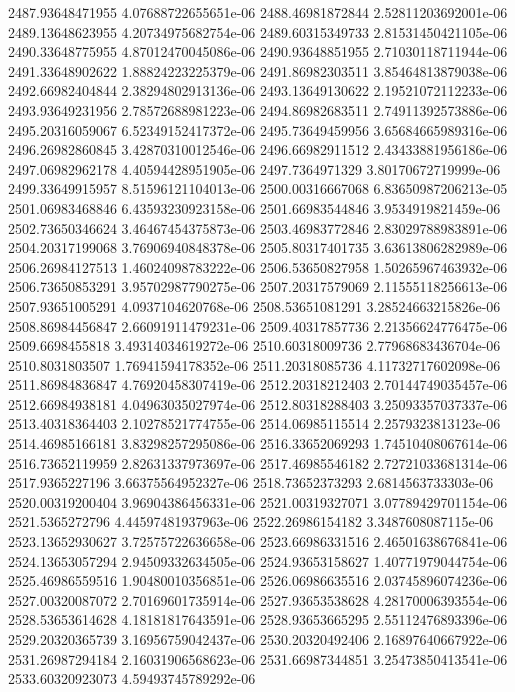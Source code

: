 {2487.93648471955 4.07688722655651e-06
2488.46981872844 2.52811203692001e-06
2489.13648623955 4.20734975682754e-06
2489.60315349733 2.81531450421105e-06
2490.33648775955 4.87012470045086e-06
2490.93648851955 2.71030118711944e-06
2491.33648902622 1.88824223225379e-06
2491.86982303511 3.85464813879038e-06
2492.66982404844 2.38294802913136e-06
2493.13649130622 2.19521072112233e-06
2493.93649231956 2.78572688981223e-06
2494.86982683511 2.74911392573886e-06
2495.20316059067 6.52349152417372e-06
2495.73649459956 3.65684665989316e-06
2496.26982860845 3.42870310012546e-06
2496.66982911512 2.43433881956186e-06
2497.06982962178 4.40594428951905e-06
2497.7364971329 3.80170672719999e-06
2499.33649915957 8.51596121104013e-06
2500.00316667068 6.83650987206213e-05
2501.06983468846 6.43593230923158e-06
2501.66983544846 3.9534919821459e-06
2502.73650346624 3.46467454375873e-06
2503.46983772846 2.83029788983891e-06
2504.20317199068 3.76906940848378e-06
2505.80317401735 3.63613806282989e-06
2506.26984127513 1.46024098783222e-06
2506.53650827958 1.50265967463932e-06
2506.73650853291 3.95702987790275e-06
2507.20317579069 2.11555118256613e-06
2507.93651005291 4.0937104620768e-06
2508.53651081291 3.28524663215826e-06
2508.86984456847 2.66091911479231e-06
2509.40317857736 2.21356624776475e-06
2509.6698455818 3.49314034619272e-06
2510.60318009736 2.77968683436704e-06
2510.8031803507 1.76941594178352e-06
2511.20318085736 4.11732717602098e-06
2511.86984836847 4.76920458307419e-06
2512.20318212403 2.70144749035457e-06
2512.66984938181 4.04963035027974e-06
2512.80318288403 3.25093357037337e-06
2513.40318364403 2.10278521774755e-06
2514.06985115514 2.2579323813123e-06
2514.46985166181 3.83298257295086e-06
2516.33652069293 1.74510408067614e-06
2516.73652119959 2.82631337973697e-06
2517.46985546182 2.72721033681314e-06
2517.9365227196 3.66375564952327e-06
2518.73652373293 2.6814563733303e-06
2520.00319200404 3.96904386456331e-06
2521.00319327071 3.07789429701154e-06
2521.5365272796 4.44597481937963e-06
2522.26986154182 3.3487608087115e-06
2523.13652930627 3.72575722636658e-06
2523.66986331516 2.46501638676841e-06
2524.13653057294 2.94509332634505e-06
2524.93653158627 1.40771979044754e-06
2525.46986559516 1.90480010356851e-06
2526.06986635516 2.03745896074236e-06
2527.00320087072 2.70169601735914e-06
2527.93653538628 4.28170006393554e-06
2528.53653614628 4.18181817643591e-06
2528.93653665295 2.55112476893396e-06
2529.20320365739 3.16956759042437e-06
2530.20320492406 2.16897640667922e-06
2531.26987294184 2.16031906568623e-06
2531.66987344851 3.25473850413541e-06
2533.60320923073 4.59493745789292e-06
}

